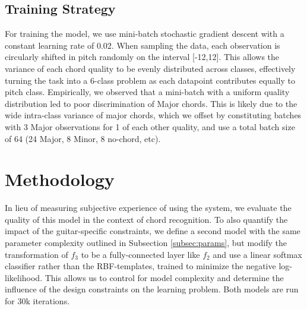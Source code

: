 \subsection{Training Strategy}
\label{subsec:strategy}

For training the model, we use mini-batch stochastic gradient descent with a constant learning rate of 0.02.
When sampling the data, each observation is circularly shifted in pitch randomly on the interval [-12,12].
This allows the variance of each chord quality to be evenly distributed across classes, effectively turning the task into a 6-class problem as each datapoint contributes equally to pitch class.
Empirically, we observed that a mini-batch with a uniform quality distribution led to poor discrimination of Major chords.
This is likely due to the wide intra-class variance of major chords, which we offset by constituting batches with 3 Major observations for 1 of each other quality, and use a total batch size of 64 (24 Major, 8 Minor, 8 no-chord, etc).


\section{Methodology}

In lieu of measuring subjective experience of using the system, we evaluate the quality of this model in the context of chord recognition.
To also quantify the impact of the guitar-specific constraints, we define a second model with the same parameter complexity outlined in Subsection \ref{subsec:params}, but modify the transformation of $f_3$ to be a fully-connected layer like $f_2$ and use a linear softmax classifier rather than the RBF-templates, trained to minimize the negative log-likelihood.
This allows us to control for model complexity and determine the influence of the design constraints on the learning problem.
Both models are run for 30k iterations.
